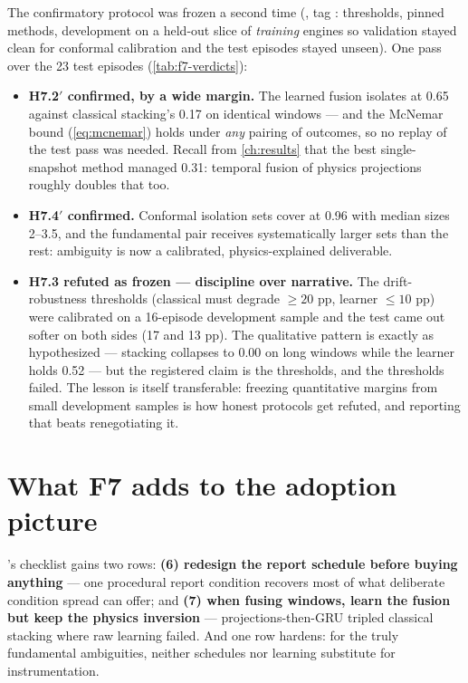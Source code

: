 The confirmatory protocol was frozen a second time (, tag
: thresholds, pinned methods, development on a held-out slice of
\emph{training} engines so validation stayed clean for conformal calibration and the test
episodes stayed unseen). One pass over the 23 test episodes (\cref{tab:f7-verdicts}):

\begin{table}[htbp]
  \centering\small
  \caption{F7 pre-registered verdicts (single confirmatory pass). Auto-generated.}
  \label{tab:f7-verdicts}
  
\end{table}

\begin{itemize}
  \item \textbf{H7.2$'$ confirmed, by a wide margin.} The learned fusion isolates at
    0.65 against classical stacking's 0.17 on identical windows --- and the McNemar bound (\cref{eq:mcnemar})
    holds under \emph{any} pairing of outcomes, so no replay of the test pass was needed.
    Recall from \cref{ch:results} that the best single-snapshot method managed 0.31: temporal
    fusion of physics projections roughly doubles that too.
  \item \textbf{H7.4$'$ confirmed.} Conformal isolation sets cover at 0.96 with median
    sizes 2--3.5, and the fundamental pair receives systematically larger sets than the
    rest: ambiguity is now a calibrated, physics-explained deliverable.
  \item \textbf{H7.3 refuted as frozen --- discipline over narrative.} The drift-robustness
    thresholds (classical must degrade $\geq 20$ pp, learner $\leq 10$ pp) were calibrated
    on a 16-episode development sample and the test came out softer on both sides (17 and
    13 pp). The qualitative pattern is exactly as hypothesized --- stacking collapses to
    0.00 on long windows while the learner holds 0.52 --- but the registered claim is the
    thresholds, and the thresholds failed. The lesson is itself transferable: freezing
    quantitative margins from small development samples is how honest protocols get
    refuted, and reporting that beats renegotiating it.
\end{itemize}

\section{What F7 adds to the adoption picture}

's checklist gains two rows: \textbf{(6) redesign the report schedule before
buying anything} --- one procedural report condition recovers most of what deliberate
condition spread can offer; and \textbf{(7) when fusing windows, learn the fusion but keep
the physics inversion} --- projections-then-GRU tripled classical stacking where raw
learning failed. And one row hardens: for the truly fundamental ambiguities, neither
schedules nor learning substitute for instrumentation.
